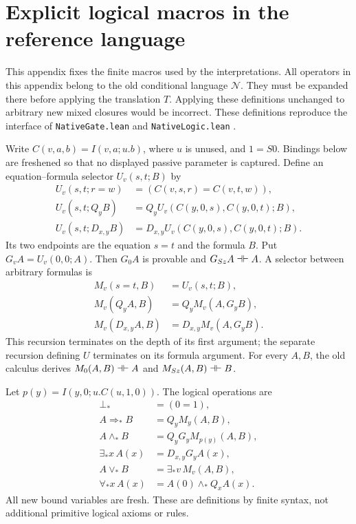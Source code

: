 \section{Explicit logical macros in the reference language}
\label{app:old-macros}

This appendix fixes the finite macros used by the interpretations. All
operators in this appendix belong to the old conditional language
$\mathcal N$. They must be expanded there before applying the translation
$T$. Applying these definitions unchanged to arbitrary new mixed
closures would be incorrect. These definitions reproduce the interface
of \texttt{NativeGate.lean} and \texttt{NativeLogic.lean}
\cite{native}.

Write $C(v,a,b)=I(v,a;u.b)$, where $u$ is unused, and $1=S0$.
Bindings below are freshened so that no displayed passive parameter is
captured. Define an equation--formula selector $U_v(s,t;B)$ by
\[
\begin{aligned}
U_v(s,t;r=w)&=(C(v,s,r)=C(v,t,w)),\\
U_v(s,t;Q_y B)&=Q_y U_v(C(y,0,s),C(y,0,t);B),\\
U_v(s,t;D_{x,y} B)&=D_{x,y}U_v(C(y,0,s),C(y,0,t);B).
\end{aligned}
\]
Its two endpoints are the equation $s=t$ and the formula $B$.
Put $G_v A=U_v(0,0;A)$. Then $G_0 A$ is provable and
$G_{Sz}A\dashv\vdash A$. A selector between arbitrary formulas is
\[
\begin{aligned}
M_v(s=t,B)&=U_v(s,t;B),\\
M_v(Q_y A,B)&=Q_y M_v(A,G_yB),\\
M_v(D_{x,y} A,B)&=D_{x,y}M_v(A,G_yB).
\end{aligned}
\]
This recursion terminates on the depth of its first argument; the
separate recursion defining $U$ terminates on its formula argument.
For every $A,B$, the old calculus derives
$M_0(A,B)\dashv\vdash A$ and $M_{Sz}(A,B)\dashv\vdash B$.

Let $p(y)=I(y,0;u.C(u,1,0))$. The logical operations are
\[
\begin{aligned}
\bot_*&=(0=1),\\
A\Rightarrow_* B&=Q_y M_y(A,B),\\
A\wedge_* B&=Q_y G_y M_{p(y)}(A,B),\\
\exists_* x\,A(x)&=D_{x,y}G_y A(x),\\
A\vee_*B&=\exists_*v\,M_v(A,B),\\
\forall_*x\,A(x)&=A(0)\wedge_* Q_x A(x).
\end{aligned}
\]
All new bound variables are fresh. These are definitions by finite
syntax, not additional primitive logical axioms or rules.

